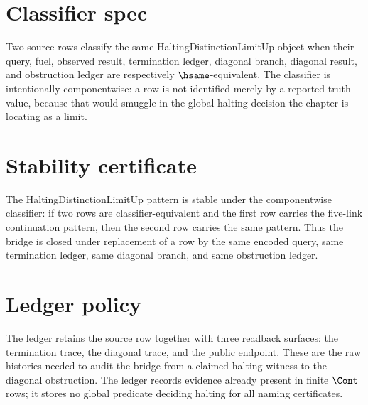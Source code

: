 \section{Classifier spec}
\label{sec:concrete-instances-halting-as-form-of-distinction-limit-classifier}

\begin{definition}
\label{def:concrete-instances-halting-as-form-of-distinction-limit-classifier}
Two source rows classify the same HaltingDistinctionLimitUp object when their query, fuel, observed result, termination ledger, diagonal branch, diagonal result, and obstruction ledger are respectively $\hsame$-equivalent. The classifier is intentionally componentwise: a row is not identified merely by a reported truth value, because that would smuggle in the global halting decision the chapter is locating as a limit.
\end{definition}

\section{Stability certificate}
\label{sec:concrete-instances-halting-as-form-of-distinction-limit-stability}

\begin{theorem}
\label{thm:concrete-instances-halting-as-form-of-distinction-limit-stability}
The HaltingDistinctionLimitUp pattern is stable under the componentwise classifier: if two rows are classifier-equivalent and the first row carries the five-link continuation pattern, then the second row carries the same pattern. Thus the bridge is closed under replacement of a row by the same encoded query, same termination ledger, same diagonal branch, and same obstruction ledger.
\end{theorem}

\section{Ledger policy}
\label{sec:concrete-instances-halting-as-form-of-distinction-limit-ledger}

\begin{definition}
\label{def:concrete-instances-halting-as-form-of-distinction-limit-ledger}
The ledger retains the source row together with three readback surfaces: the termination trace, the diagonal trace, and the public endpoint. These are the raw histories needed to audit the bridge from a claimed halting witness to the diagonal obstruction. The ledger records evidence already present in finite $\Cont$ rows; it stores no global predicate deciding halting for all naming certificates.
\end{definition}

